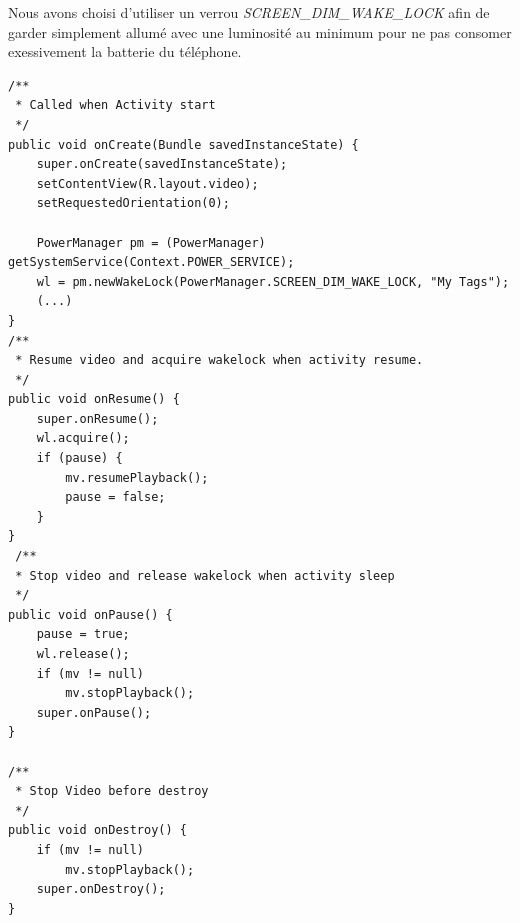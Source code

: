 Nous avons choisi d'utiliser un verrou \textit{SCREEN\_DIM\_WAKE\_LOCK} afin de
garder simplement allumé avec une luminosité au minimum pour ne pas consomer
exessivement la batterie du téléphone.
\newpage
 \begin{lstlisting}[caption={Video life-cycle}] 
/**
 * Called when Activity start
 */
public void onCreate(Bundle savedInstanceState) {
	super.onCreate(savedInstanceState);
	setContentView(R.layout.video);
	setRequestedOrientation(0);
	
	PowerManager pm = (PowerManager) getSystemService(Context.POWER_SERVICE);
	wl = pm.newWakeLock(PowerManager.SCREEN_DIM_WAKE_LOCK, "My Tags");
	(...)
}
/**
 * Resume video and acquire wakelock when activity resume.
 */
public void onResume() {
	super.onResume();
	wl.acquire();
	if (pause) {
	    mv.resumePlayback();
	    pause = false;
	}
}
 /**
 * Stop video and release wakelock when activity sleep
 */
public void onPause() {
	pause = true;
	wl.release();
	if (mv != null)
	    mv.stopPlayback();
	super.onPause();
}

/**
 * Stop Video before destroy
 */
public void onDestroy() {
	if (mv != null)
	    mv.stopPlayback();
	super.onDestroy();
}
\end{lstlisting}

